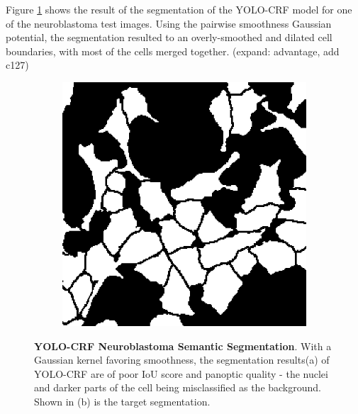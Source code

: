 \documentclass[10pt, journal, compsoc]{IEEEtran}
\begin{document}
Figure \ref{fig:yolocrf_results} shows the result of the segmentation of the YOLO-CRF model for one of the neuroblastoma test images. Using the pairwise smoothness Gaussian potential, the segmentation resulted to an overly-smoothed and dilated cell boundaries, with most of the cells merged together. (expand: advantage, add c127)
\begin{figure}
\centering
\begin{subfigure}[b]{0.45\linewidth}
\caption{}
\end{subfigure}
\begin{subfigure}[b]{0.45\linewidth}
\includegraphics[width=\linewidth]{unet/110115.jpg}
\caption{}
\end{subfigure}
\caption{\textbf{YOLO-CRF Neuroblastoma Semantic Segmentation}. With a Gaussian kernel favoring smoothness, the segmentation results(a) of YOLO-CRF are of poor IoU score and panoptic quality - the nuclei and darker parts of the cell being misclassified as the background. Shown in (b) is the target segmentation.}
\label{fig:yolocrf_results}
\end{figure}

\end{document}
